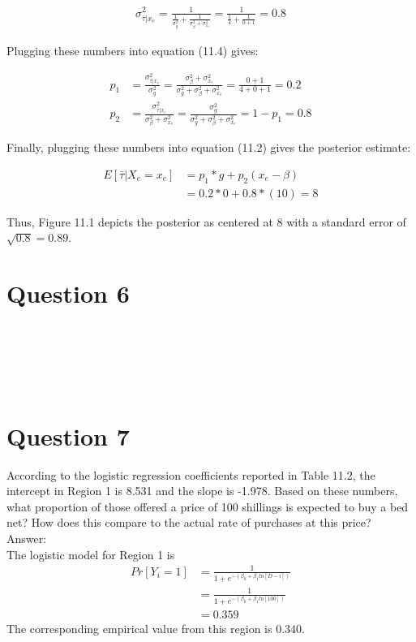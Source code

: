 \documentclass[11pt,notitlepage]{article}\usepackage[]{graphicx}\usepackage[]{color}
\makeatletter
\newenvironment{kframe}{%
 \def\at@end@of@kframe{}%
 \ifinner\ifhmode%
  \def\at@end@of@kframe{\end{minipage}}%
  \begin{minipage}{\columnwidth}%
 \fi\fi%
 \def\FrameCommand##1{\hskip\@totalleftmargin \hskip-\fboxsep
 \colorbox{shadecolor}{##1}\hskip-\fboxsep
     \hskip-\linewidth \hskip-\@totalleftmargin \hskip\columnwidth}%
 \MakeFramed {\advance\hsize-\width
   \@totalleftmargin\z@ \linewidth\hsize
   \@setminipage}}%
 {\par\unskip\endMakeFramed%
 \at@end@of@kframe}
\newenvironment{knitrout}{}{} %
\makeatother
\begin{document}
 \begin{align*}
\sigma^2_{\bar{\tau}|x_e} = \frac{1}{\frac{1}{\sigma^2_g} + \frac{1}{\sigma^2_{\beta} + \sigma^2_{x_e}}} = \frac{1}{\frac{1}{4} + \frac{1}{0+1}} = 0.8
\end{align*}
 
Plugging these numbers into equation (11.4) gives: 

\begin{align*}
p_1 &= \frac{\sigma^2_{\bar{\tau}|x_e}}{\sigma^2_g} = \frac{\sigma^2_{\beta} + \sigma^2_{x_e}}{\sigma^2_g +\sigma^2_{\beta} + \sigma^2_{x_e}} = \frac{0+1}{4+0+1} = 0.2\\
p_2 &= \frac{\sigma^2_{\bar{\tau}|x_e}}{\sigma^2_{\beta} + \sigma^2_{x_e}} = \frac{\sigma^2_g}{\sigma^2_g +\sigma^2_{\beta} + \sigma^2_{x_e}} = 1 - p_1 = 0.8
\end{align*}

Finally, plugging these numbers into equation (11.2) gives the posterior estimate:

\begin{align*}
E[\bar{\tau}|X_e = x_e] &= p_1*g + p_2(x_e - \beta) \\
&= 0.2 * 0 + 0.8*(10) = 8
\end{align*}

Thus, Figure 11.1 depicts the posterior as centered at 8 with a standard error of $\sqrt{0.8}=0.89$.

\section*{Question 6}
\begin{knitrout}
\color{fgcolor}\begin{kframe}
\begin{verbatim}





\end{verbatim}
\end{kframe}
\end{knitrout}



\section*{Question 7}
According to the logistic regression coefficients reported in Table 11.2, the intercept in Region 1 is 8.531 and the slope is -1.978. Based on these numbers, what proportion of those offered a price of 100 shillings is expected to buy a bed net? How does this compare to the actual rate of purchases at this price?\\
Answer:\\
The logistic model for Region 1 is 
\begin{align*}
Pr[Y_i=1] &= \frac{1}{1+e^{-(\beta_0 + \beta_1 ln[D-i])}}\\
&= \frac{1}{1+e^{-(\beta_0 + \beta_1 ln[100])}}\\
&=0.359
\end{align*}
The corresponding empirical value from this region is 0.340.
\end{document}
